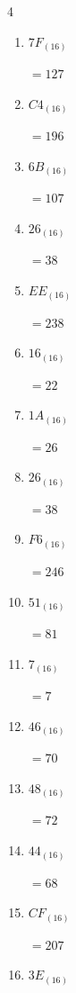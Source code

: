 \begin{multicols}{4}
\begin{enumerate}
        $=142$

\columnbreak %

  \item $7F_{(16)}$

        $=127$

  \item $C4_{(16)}$

        $=196$

  \item $6B_{(16)}$

        $=107$

  \item $26_{(16)}$

        $=38$

  \item $EE_{(16)}$

        $=238$

  \item $16_{(16)}$

        $=22$

  \item $1A_{(16)}$

        $=26$

  \item $26_{(16)}$

        $=38$

  \item $F6_{(16)}$

        $=246$

  \item $51_{(16)}$

        $=81$

  \item $7_{(16)}$

        $=7$

  \item $46_{(16)}$

        $=70$

  \item $48_{(16)}$

        $=72$

  \item $44_{(16)}$

        $=68$

  \item $CF_{(16)}$

        $=207$

\columnbreak %

  \item $3E_{(16)}$


\end{enumerate}
\end{multicols}
